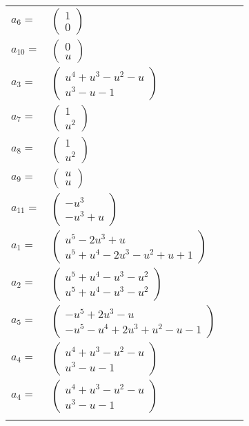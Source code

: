 \documentclass[1p]{elsarticle_modified}
\theoremstyle{definition}
\begin{document}
\begin{tabular}{m{7pt} m{180pt} m{7pt} m{180pt} }
\flushright $a_{6}=$&$\begin{pmatrix}1\\0\end{pmatrix}$ \\
\flushright $a_{10}=$&$\begin{pmatrix}0\\u\end{pmatrix}$ \\
\flushright $a_{3}=$&$\begin{pmatrix}u^4+u^3- u^2- u\\u^3- u-1\end{pmatrix}$ \\
\flushright $a_{7}=$&$\begin{pmatrix}1\\u^2\end{pmatrix}$ \\
\flushright $a_{8}=$&$\begin{pmatrix}1\\u^2\end{pmatrix}$ \\
\flushright $a_{9}=$&$\begin{pmatrix}u\\u\end{pmatrix}$ \\
\flushright $a_{11}=$&$\begin{pmatrix}- u^3\\- u^3+u\end{pmatrix}$ \\
\flushright $a_{1}=$&$\begin{pmatrix}u^5-2 u^3+u\\u^5+u^4-2 u^3- u^2+u+1\end{pmatrix}$ \\
\flushright $a_{2}=$&$\begin{pmatrix}u^5+u^4- u^3- u^2\\u^5+u^4- u^3- u^2\end{pmatrix}$ \\
\flushright $a_{5}=$&$\begin{pmatrix}- u^5+2 u^3- u\\- u^5- u^4+2 u^3+u^2- u-1\end{pmatrix}$ \\
\flushright $a_{4}=$&$\begin{pmatrix}u^4+u^3- u^2- u\\u^3- u-1\end{pmatrix}$\\ \flushright $a_{4}=$&$\begin{pmatrix}u^4+u^3- u^2- u\\u^3- u-1\end{pmatrix}$\\&\end{tabular}
\end{document}
